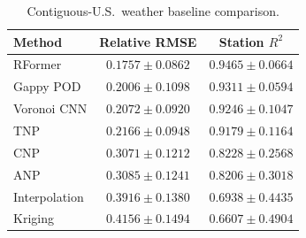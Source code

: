 \begin{table}[t]
  \centering
  \caption{Contiguous-U.S.\ weather baseline comparison.}
  \label{tab:rformer:weather}
  \begin{tabular}{lcc}
    \toprule
    Method & Relative RMSE & Station $R^2$ \\
    \midrule
    RFormer       & $\mathbf{0.1757 \pm 0.0862}$ & $\mathbf{0.9465 \pm 0.0664}$ \\
    Gappy POD     & $0.2006 \pm 0.1098$ & $0.9311 \pm 0.0594$ \\
    Voronoi CNN   & $0.2072 \pm 0.0920$ & $0.9246 \pm 0.1047$ \\
    TNP           & $0.2166 \pm 0.0948$ & $0.9179 \pm 0.1164$ \\
    CNP           & $0.3071 \pm 0.1212$ & $0.8228 \pm 0.2568$ \\
    ANP           & $0.3085 \pm 0.1241$ & $0.8206 \pm 0.3018$ \\
    Interpolation & $0.3916 \pm 0.1380$ & $0.6938 \pm 0.4435$ \\
    Kriging       & $0.4156 \pm 0.1494$ & $0.6607 \pm 0.4904$ \\
    \bottomrule
  \end{tabular}
\end{table}
